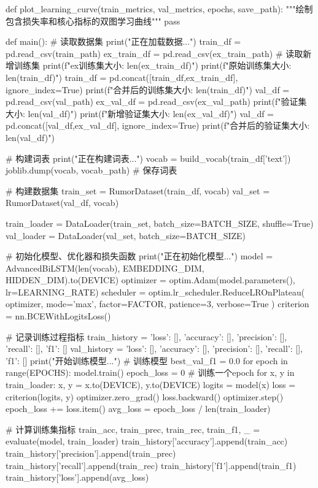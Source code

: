 \begin{codeblock}[language=Python]
def plot_learning_curve(train_metrics, val_metrics, epochs, save_path):
    """绘制包含损失率和核心指标的双图学习曲线"""
    pass

def main():
    # 读取数据集
    print("正在加载数据...")
    train_df = pd.read_csv(train_path)
    ex_train_df = pd.read_csv(ex_train_path)  # 读取新增训练集
    print(f"ex训练集大小: {len(ex_train_df)}")
    print(f"原始训练集大小: {len(train_df)}")
    train_df = pd.concat([train_df,ex_train_df], ignore_index=True)
    print(f"合并后的训练集大小: {len(train_df)}")
    val_df = pd.read_csv(val_path)
    ex_val_df = pd.read_csv(ex_val_path)
    print(f"验证集大小: {len(val_df)}")
    print(f"新增验证集大小: {len(ex_val_df)}")
    val_df = pd.concat([val_df,ex_val_df], ignore_index=True)
    print(f"合并后的验证集大小: {len(val_df)}")

    # 构建词表
    print("正在构建词表...")
    vocab = build_vocab(train_df['text'])
    joblib.dump(vocab, vocab_path)  # 保存词表
    
    # 构建数据集
    train_set = RumorDataset(train_df, vocab)
    val_set = RumorDataset(val_df, vocab)

    train_loader = DataLoader(train_set, batch_size=BATCH_SIZE, shuffle=True)
    val_loader = DataLoader(val_set, batch_size=BATCH_SIZE)

    # 初始化模型、优化器和损失函数
    print("正在初始化模型...")
    model = AdvancedBiLSTM(len(vocab), EMBEDDING_DIM, HIDDEN_DIM).to(DEVICE)
    optimizer = optim.Adam(model.parameters(), lr=LEARNING_RATE)
    scheduler = optim.lr_scheduler.ReduceLROnPlateau(
    optimizer, mode='max', factor=FACTOR, patience=3, verbose=True
    )
    criterion = nn.BCEWithLogitsLoss()

    # 记录训练过程指标
    train_history = {
        'loss': [], 'accuracy': [], 'precision': [], 'recall': [], 'f1': []
    }
    val_history = {
        'loss': [], 'accuracy': [], 'precision': [], 'recall': [], 'f1': []
    }
    print("开始训练模型...")
    # 训练模型
    best_val_f1 = 0.0
    for epoch in range(EPOCHS):
        model.train()
        epoch_loss = 0
        # 训练一个epoch
        for x, y in train_loader:
            x, y = x.to(DEVICE), y.to(DEVICE)
            logits = model(x)
            loss = criterion(logits, y)
            optimizer.zero_grad()
            loss.backward()
            optimizer.step()
            epoch_loss += loss.item()   
        avg_loss = epoch_loss / len(train_loader)

        # 计算训练集指标
        train_acc, train_prec, train_rec, train_f1, _ = evaluate(model, train_loader)
        train_history['accuracy'].append(train_acc)
        train_history['precision'].append(train_prec)
        train_history['recall'].append(train_rec)
        train_history['f1'].append(train_f1)
        train_history['loss'].append(avg_loss)


\end{codeblock}
